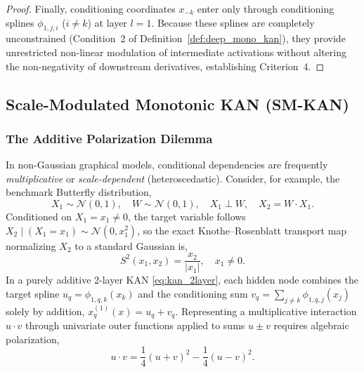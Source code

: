 \documentclass[11pt,a4paper]{article}
\theoremstyle{plain}
\theoremstyle{definition}
\theoremstyle{remark}
\begin{document}
\begin{proof}
Finally, conditioning coordinates $x_{-k}$ enter only through conditioning splines $\phi_{1, j, i}$ ($i \neq k$) at layer $l=1$. Because these splines are completely unconstrained (Condition~2 of Definition~\ref{def:deep_mono_kan}), they provide unrestricted non-linear modulation of intermediate activations without altering the non-negativity of downstream derivatives, establishing Criterion~4.
\end{proof}
\subsection{Scale-Modulated Monotonic KAN (SM-KAN)}

\subsubsection{The Additive Polarization Dilemma}
In non-Gaussian graphical models, conditional dependencies are frequently \emph{multiplicative} or \emph{scale-dependent} (heteroscedastic). Consider, for example, the benchmark Butterfly distribution,
\begin{equation}
    X_1 \sim \mathcal{N}(0, 1), \quad W \sim \mathcal{N}(0, 1), \quad X_1 \perp W, \quad X_2 = W \cdot X_1.
    \label{eq:butterfly_def}
\end{equation}
Conditioned on $X_1 = x_1 \neq 0$, the target variable follows $X_2 \mid (X_1 = x_1) \sim \mathcal{N}(0, x_1^2)$, so the exact Knothe--Rosenblatt transport map normalizing $X_2$ to a standard Gaussian is,
\begin{equation}
    S^2(x_1, x_2) = \frac{x_2}{|x_1|}, \quad x_1 \neq 0.
    \label{eq:butterfly_ideal_map}
\end{equation}
In a purely additive 2-layer KAN \eqref{eq:kan_2layer}, each hidden node combines the target spline $u_q = \phi_{1, q, k}(x_k)$ and the conditioning sum $v_q = \sum_{j \neq k} \phi_{1, q, j}(x_j)$ solely by addition, $x^{(1)}_q(x) = u_q + v_q$. Representing a multiplicative interaction $u \cdot v$ through univariate outer functions applied to sums $u \pm v$ requires algebraic polarization,
\begin{equation}
    u \cdot v = \frac{1}{4}(u + v)^2 - \frac{1}{4}(u - v)^2.
    \label{eq:polarization_identity}
\end{equation}
\end{document}
